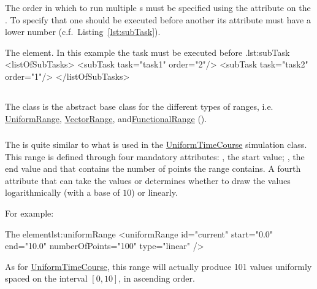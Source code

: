 The order in which to run multiple s must be specified using the  attribute on the . To specify that one  should be executed before another its  attribute must have a lower number (c.f.\ Listing~\ref{lst:subTask}).

\begin{myXmlLst}{The  element. In this example the task  must be executed before .}{lst:subTask}
<listOfSubTasks>
	<subTask task="task1" order="2"/> 
	<subTask task="task2" order="1"/> 
</listOfSubTasks>
\end{myXmlLst}

\subsection{}
\label{class:range}
The  class is the abstract base class for the different types of ranges, i.e. \hyperref[class:uniformRange]{UniformRange}, \hyperref[class:vectorRange]{VectorRange}, and\hyperref[class:functionalRange]{FunctionalRange} (). 


\subsubsection{}
\label{class:uniformRange}
The  is quite similar to what is used in the \hyperref[class:uniformTimeCourse]{UniformTimeCourse} simulation class. This range is defined through four mandatory attributes: , the start value; , the end value and  that contains the number of points the range contains. A fourth attribute  that can take the values  or  determines whether to draw the values logarithmically (with a base of $10$) or linearly.

For example:
\begin{myXmlLst}{The  element}{lst:uniformRange}
<uniformRange id="current" start="0.0" end="10.0" numberOfPoints="100" type="linear" /> 
\end{myXmlLst}
As for \hyperref[class:uniformTimeCourse]{UniformTimeCourse}, this range will actually produce 101 values uniformly spaced on the interval $[0, 10]$, in ascending order.


